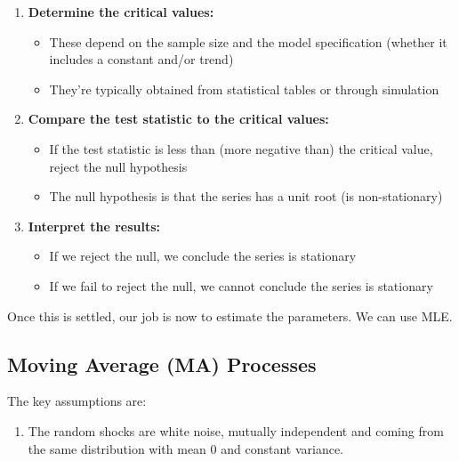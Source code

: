 \documentclass{article}
\begin{document}
\begin{definition}
\begin{enumerate}
        \item \textbf{Determine the critical values:}
        \begin{itemize}
            \item These depend on the sample size and the model specification (whether it includes a constant and/or trend)
            \item They're typically obtained from statistical tables or through simulation
        \end{itemize}

        \item \textbf{Compare the test statistic to the critical values:}
        \begin{itemize}
            \item If the test statistic is less than (more negative than) the critical value, reject the null hypothesis
            \item The null hypothesis is that the series has a unit root (is non-stationary)
        \end{itemize}

        \item \textbf{Interpret the results:}
        \begin{itemize}
            \item If we reject the null, we conclude the series is stationary
            \item If we fail to reject the null, we cannot conclude the series is stationary
        \end{itemize}
      \end{enumerate} 
    \end{definition}

    Once this is settled, our job is now to estimate the parameters. We can use MLE. 
    

  \subsection{Moving Average (MA) Processes}

    The key assumptions are: 
    \begin{enumerate}
      \item The random shocks are white noise, mutually independent and coming from the same distribution with mean $0$ and constant variance. 
    \end{enumerate}
\end{document}
